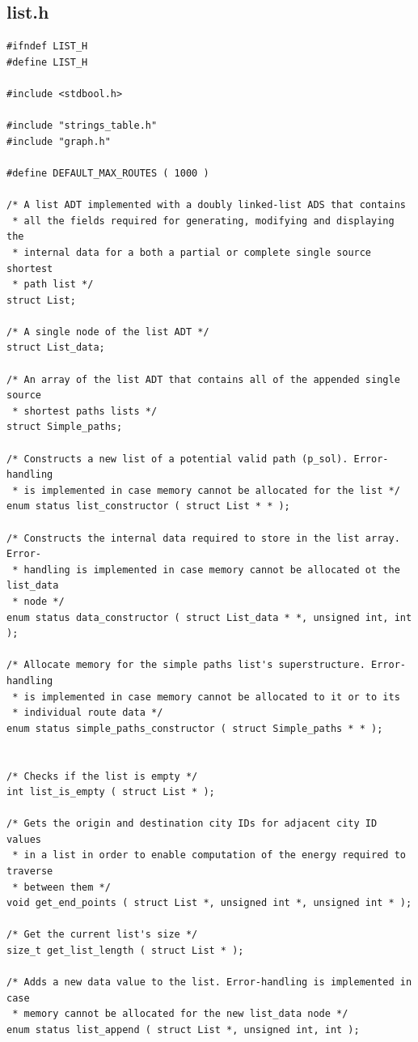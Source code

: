\documentclass[11pt]{article}
\begin{document}
\subsection{list.h}
\begin{verbatim}
#ifndef LIST_H
#define LIST_H

#include <stdbool.h>

#include "strings_table.h"
#include "graph.h"

#define DEFAULT_MAX_ROUTES ( 1000 )

/* A list ADT implemented with a doubly linked-list ADS that contains
 * all the fields required for generating, modifying and displaying the
 * internal data for a both a partial or complete single source shortest
 * path list */
struct List;

/* A single node of the list ADT */
struct List_data;

/* An array of the list ADT that contains all of the appended single source
 * shortest paths lists */
struct Simple_paths;

/* Constructs a new list of a potential valid path (p_sol). Error-handling
 * is implemented in case memory cannot be allocated for the list */
enum status list_constructor ( struct List * * );

/* Constructs the internal data required to store in the list array. Error-
 * handling is implemented in case memory cannot be allocated ot the list_data
 * node */
enum status data_constructor ( struct List_data * *, unsigned int, int );

/* Allocate memory for the simple paths list's superstructure. Error-handling
 * is implemented in case memory cannot be allocated to it or to its
 * individual route data */
enum status simple_paths_constructor ( struct Simple_paths * * );


/* Checks if the list is empty */
int list_is_empty ( struct List * );

/* Gets the origin and destination city IDs for adjacent city ID values
 * in a list in order to enable computation of the energy required to traverse
 * between them */
void get_end_points ( struct List *, unsigned int *, unsigned int * );

/* Get the current list's size */
size_t get_list_length ( struct List * );

/* Adds a new data value to the list. Error-handling is implemented in case
 * memory cannot be allocated for the new list_data node */
enum status list_append ( struct List *, unsigned int, int );


\end{verbatim}
\end{document}
